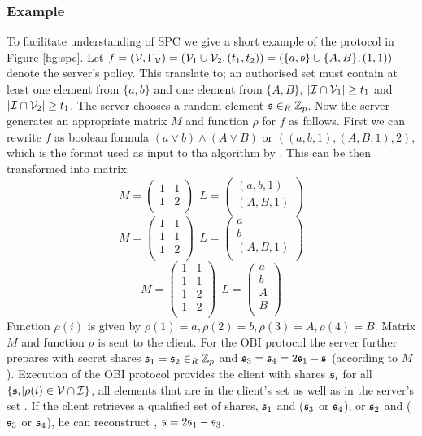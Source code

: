\subsubsection{Example}\label{spc:example}
To facilitate understanding of \ac{SPC} we give a short example of the protocol in Figure \ref{fig:spc}.
Let $f=(\mathcal{V}, \Gamma_\mathcal{V})=(\mathcal{V}_1\cup\mathcal{V}_2, (t_1,t_2))=(\{a,b\}\cup\{A,B\}, (1,1))$ denote the server's policy.
This translate to; an authorised set must contain at least one element from $\{a,b\}$ and one element from $\{A,B\}$, \ie $|\mathcal{I}\cap\mathcal{V}_1|\geq t_1$ and $|\mathcal{I}\cap\mathcal{V}_2|\geq t_1$.
The server chooses a random element $\mathfrak{s}\in_R\mathbb{Z}_p$.
Now the server generates an appropriate matrix $M$ and function $\rho$ for $f$ as follows.
First we can rewrite $f$ as boolean formula $(a\vee b)\wedge(A\vee B)$ or $((a,b,1),(A,B,1),2)$, which is the format used as input to tha algorithm by \citet{LiuC10}.
This can be then transformed into matrix:
\[M=
\begin{pmatrix}
  1 & 1 \\
  1 & 2 \\
\end{pmatrix}
~~ L=
\begin{pmatrix}
  (a,b,1) \\
  (A,B,1) \\
\end{pmatrix}
\]
\[M=
\begin{pmatrix}
  1 & 1 \\
  1 & 1 \\
  1 & 2 \\
\end{pmatrix}
~~ L=
\begin{pmatrix}
  a \\
  b \\
  (A,B,1) \\
\end{pmatrix}
\]
\[M=
\begin{pmatrix}
  1 & 1 \\
  1 & 1 \\
  1 & 2 \\
  1 & 2 \\
\end{pmatrix}
~~ L=
\begin{pmatrix}
  a \\
  b \\
  A \\
  B \\
\end{pmatrix}
\]
Function $\rho(i)$ is given by $\rho(1)=a,\rho(2)=b,\rho(3)=A,\rho(4)=B$.
Matrix $M$ and function $\rho$ is sent to the client.
For the \ac{OBI} protocol the server further prepares \ServerSet with secret shares $\mathfrak{s}_1=\mathfrak{s}_2\in_R\mathbb{Z}_p$ and $\mathfrak{s}_3=\mathfrak{s}_4=2\mathfrak{s}_1-\mathfrak{s}$ (according to $M$).
Execution of the \ac{OBI} protocol provides the client with shares $\mathfrak{s}_i$ for all $\{\mathfrak{s}_i|\rho(i)\in \mathcal{V}\cap \mathcal{I}\}$, \ie all elements that are in the client's set \ClientSet as well as in the server's set \ServerSet.
If the client retrieves a qualified set of shares, \ie $\mathfrak{s}_1$ and ($\mathfrak{s}_3$ or $\mathfrak{s}_4$), or $\mathfrak{s}_2$ and ($\mathfrak{s}_3$ or $\mathfrak{s}_4$), he can reconstruct \secret, \eg $\mathfrak{s}=2\mathfrak{s}_1-\mathfrak{s}_3$.

